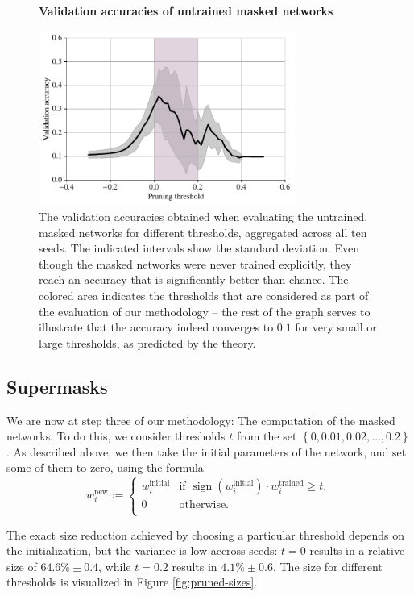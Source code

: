 \documentclass[12pt,final,twoside]{article}
\theoremstyle{plain}
\theoremstyle{definition}
\theoremstyle{remark}
\theoremstyle{named}
\begin{document}
\begin{figure}[h]
  \centering
  \textbf{Validation accuracies of untrained masked networks}\par\medskip
  \includegraphics[width=0.75\textwidth]{plots/pruned_accuracies.pdf}
  \caption{The validation accuracies obtained when evaluating the untrained, masked networks for different thresholds, aggregated across all ten seeds. The indicated intervals show the standard deviation. Even though the masked networks were never trained explicitly, they reach an accuracy that is significantly better than chance. The colored area indicates the thresholds that are considered as part of the evaluation of our methodology -- the rest of the graph serves to illustrate that the accuracy indeed converges to $0.1$ for very small or large thresholds, as predicted by the theory.}
  \label{fig:pruned-accuracies}
\end{figure}

\subsection{Supermasks}

We are now at step three of our methodology: The computation of the masked networks. To do this, we consider thresholds $t$ from the set $\left\{0, 0.01, 0.02, \ldots, 0.2\right\}$. As described above, we then take the initial parameters of the network, and set some of them to zero, using the formula
$$
w_i^{\text{new}} := \begin{cases}
w_i^{\text{initial}} & \text{if } \operatorname{sign}\left(w_i^{\text{initial}} \right) \cdot w_i^{\text{trained}} \geq t, \\ 
0 & \text{otherwise.} \\
\end{cases}
$$

The exact size reduction achieved by choosing a particular threshold depends on the initialization, but the variance is low accross seeds: $t=0$ results in a relative size of $64.6\% \pm 0.4$, while $t=0.2$ results in $4.1\% \pm 0.6$. The size for different thresholds is visualized in Figure \ref{fig:pruned-sizes}.
\end{document}
